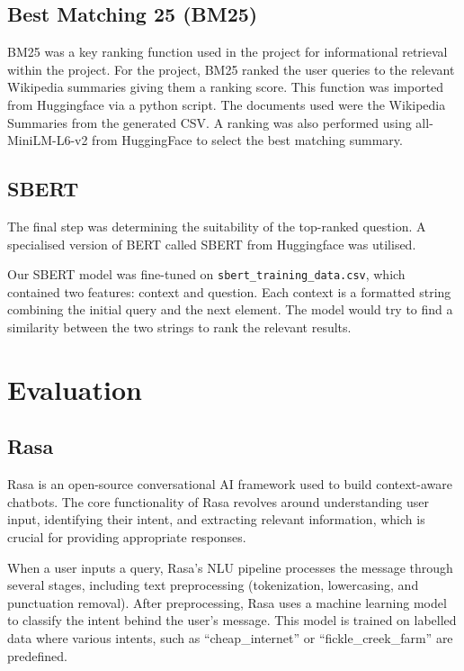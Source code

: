 \documentclass[11pt]{article}
\begin{document}
\subsection{Best Matching 25 (BM25)}
BM25 was a key ranking function used in the project for informational retrieval within the project. For the project, BM25 ranked the user queries to the relevant Wikipedia summaries giving them a ranking score. This function was imported from Huggingface via a python script. 
 \newline
 \newline
The documents used were the Wikipedia Summaries from the generated CSV. A ranking was also performed using all-MiniLM-L6-v2 from HuggingFace to select the best matching summary.

\subsection{SBERT}
The final step was determining the suitability of the top-ranked question. A specialised version of BERT called SBERT from Huggingface was utilised.

Our SBERT model was fine-tuned on \texttt{sbert\_training\_data.csv}, which contained two features: context and question. Each context is a formatted string combining the initial query and the next element. The model would try to find a similarity between the two strings to rank the relevant results.


\section{Evaluation}
\subsection{Rasa}
Rasa is an open-source conversational AI framework used to build context-aware chatbots. The core functionality of Rasa revolves around understanding user input, identifying their intent, and extracting relevant information, which is crucial for providing appropriate responses. 

When a user inputs a query, Rasa's NLU pipeline processes the message through several stages, including text preprocessing (tokenization, lowercasing, and punctuation removal). After preprocessing, Rasa uses a machine learning model to classify the intent behind the user's message. This model is trained on labelled data where various intents, such as “cheap\_internet” or “fickle\_creek\_farm” are predefined.
\end{document}
